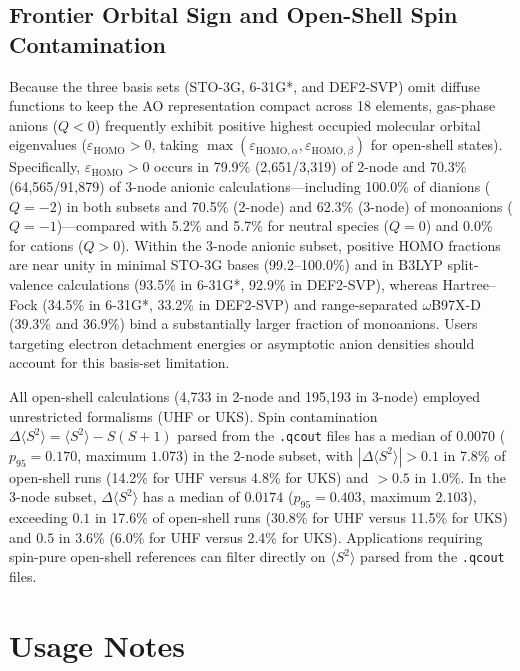 \documentclass[fleqn,10pt]{article}
\begin{document}
\subsection*{Frontier Orbital Sign and Open-Shell Spin Contamination}

Because the three basis sets (STO-3G, 6-31G*, and DEF2-SVP) omit diffuse functions to keep the AO representation compact across 18 elements, gas-phase anions ($Q < 0$) frequently exhibit positive highest occupied molecular orbital eigenvalues ($\varepsilon_{\mathrm{HOMO}} > 0$, taking $\max(\varepsilon_{\mathrm{HOMO},\alpha}, \varepsilon_{\mathrm{HOMO},\beta})$ for open-shell states). Specifically, $\varepsilon_{\mathrm{HOMO}} > 0$ occurs in 79.9\% (2,651/3,319) of 2-node and 70.3\% (64,565/91,879) of 3-node anionic calculations---including 100.0\% of dianions ($Q=-2$) in both subsets and 70.5\% (2-node) and 62.3\% (3-node) of monoanions ($Q=-1$)---compared with 5.2\% and 5.7\% for neutral species ($Q=0$) and 0.0\% for cations ($Q>0$). Within the 3-node anionic subset, positive HOMO fractions are near unity in minimal STO-3G bases (99.2--100.0\%) and in B3LYP split-valence calculations (93.5\% in 6-31G*, 92.9\% in DEF2-SVP), whereas Hartree--Fock (34.5\% in 6-31G*, 33.2\% in DEF2-SVP) and range-separated $\omega$B97X-D (39.3\% and 36.9\%) bind a substantially larger fraction of monoanions. Users targeting electron detachment energies or asymptotic anion densities should account for this basis-set limitation.

All open-shell calculations (4,733 in 2-node and 195,193 in 3-node) employed unrestricted formalisms (UHF or UKS). Spin contamination $\Delta\langle S^2\rangle = \langle S^2\rangle - S(S+1)$ parsed from the \texttt{.qcout} files has a median of $0.0070$ ($p_{95} = 0.170$, maximum $1.073$) in the 2-node subset, with $|\Delta\langle S^2\rangle| > 0.1$ in 7.8\% of open-shell runs (14.2\% for UHF versus 4.8\% for UKS) and $> 0.5$ in 1.0\%. In the 3-node subset, $\Delta\langle S^2\rangle$ has a median of $0.0174$ ($p_{95} = 0.403$, maximum $2.103$), exceeding $0.1$ in 17.6\% of open-shell runs (30.8\% for UHF versus 11.5\% for UKS) and $0.5$ in 3.6\% (6.0\% for UHF versus 2.4\% for UKS). Applications requiring spin-pure open-shell references can filter directly on $\langle S^2\rangle$ parsed from the \texttt{.qcout} files.

\section*{Usage Notes}
\end{document}
